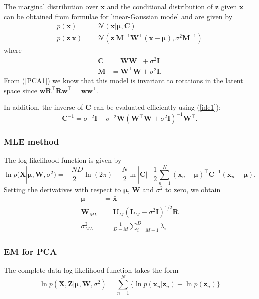 \documentclass[a4paper]{book}
\renewcommand{\bf}{\mathbf}
\renewcommand{\cal}{\mathcal}
\newcommand{\bs}{\boldsymbol}
\begin{document}
The marginal distribution over $\bf{x}$ and the conditional distribution of $\bf{z}$ given $\bf{x}$ can be obtained from formulae for linear-Gaussian model and are given by
\begin{align}
	p(\bf{x}) &= \cal{N}(\bf{x}|\bs{\mu},\bf{C}) \\
	p(\bf{z|x}) &= \cal{N}(\bf{z}|\bf{M}^{-1}\bf{W}^{\intercal}(\bf{x}-\bs{\mu}),\sigma^2\bf{M}^{-1})
\end{align}
where
\begin{align}
	\bf{C} &= \bf{W}\bf{W}^{\intercal} + \sigma^2 \bf{I} \label{PCA1}\\
	\bf{M} &= \bf{W}^{\intercal} \bf{W} + \sigma^2 \bf{I}.
\end{align}
From (\ref{PCA1}) we know that this model is invariant to rotations in the latent space since $\bf{wR}^{\intercal}\bf{Rw}^{\intercal} = \bf{ww}^{\intercal}$.

In addition, the inverse of $\bf{C}$ can be evaluated efficiently using (\ref{ide1}):
\begin{equation}
	\bf{C}^{-1} = \sigma^{-2}\bf{I} - \sigma^{-2}\bf{W}(\bf{W}^{\intercal}\bf{W}+\sigma^2 \bf{I})^{-1} \bf{W}^{\intercal}.
\end{equation}
\subsubsection{MLE method}
The log likelihood function is given by
\begin{equation}
	\ln p(\bf{X}|\bs{\mu},\bf{W},\sigma^2) = \frac{-ND}{2}\ln(2\pi)-\frac{N}{2}\ln|\bf{C}|-\frac{1}{2}\sum_{n=1}^N (\bf{x}_n-\bs{\mu})^{\intercal} \bf{C}^{-1} (\bf{x}_n - \bs{\mu}).
\end{equation}
Setting the derivatives with respect to $\bs{\mu}$, $\bf{W}$ and $\sigma^2$ to zero, we obtain
\begin{align}
	\bf{\mu} &= \bar{\bf{x}} \\
	\bf{W}_{ML} &= \bf{U}_M (\bf{L}_M-\sigma^2 \bf{I})^{1/2}\bf{R} \\
	\sigma_{ML}^2 &= \frac{1}{D-M} \sum_{i=M+1}^D \lambda_i
\end{align}
\subsubsection{EM for PCA}
The complete-data log likelihood function takes the form
\begin{equation}
	\ln p(\bf{X,Z}|\bs{\mu},\bf{W},\sigma^2) = \sum_{n=1}^N \{ \ln p(\bf{x}_n|\bf{z}_n)+ \ln p(\bf{z}_n) \}
\end{equation}
\end{document}
